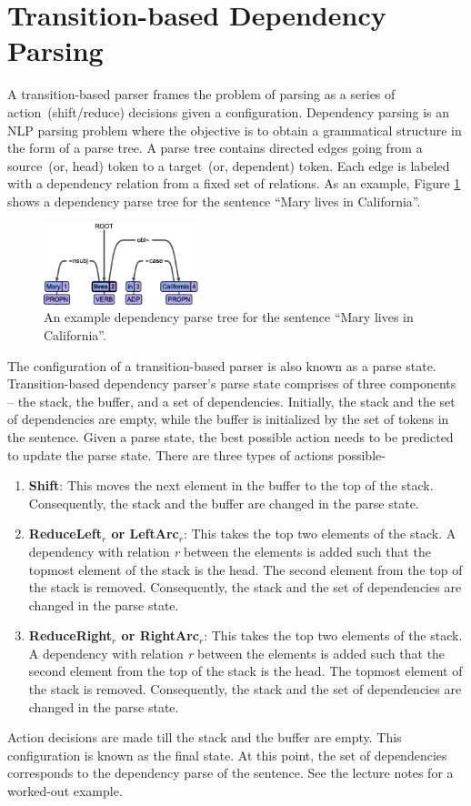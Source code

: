 \section{Transition-based Dependency Parsing}
A transition-based parser frames the problem of parsing as a series of action~(shift/reduce) decisions given a configuration. Dependency parsing is an NLP parsing problem where the objective is to obtain a grammatical structure in the form of a parse tree. A parse tree contains directed edges going from a source~(or, head) token to a target~(or, dependent) token. Each edge is labeled with a dependency relation from a fixed set of relations. As an example, Figure \ref{fig:ex} shows a dependency parse tree for the sentence ``Mary lives in California''.
\begin{figure}[h!]
    \centering
    \includegraphics[width=0.4\textwidth]{ud_example.png}
    \caption{An example dependency parse tree for the sentence ``Mary lives in California''.}
    \label{fig:ex}
\end{figure}

The configuration of a transition-based parser is also known as a parse state.  Transition-based dependency parser's parse state comprises of three components -- the stack, the buffer, and a set of dependencies. Initially, the stack and the set of dependencies are empty, while the buffer is initialized by the set of tokens in the sentence. Given a parse state, the best possible action needs to be predicted to update the parse state. There are three types of actions possible-
\begin{enumerate}
    \item \textbf{Shift}: This moves the next element in the buffer to the top of the stack. Consequently, the stack and the buffer are changed in the parse state.
    \item \textbf{ReduceLeft$_{r}$ or LeftArc$_{r}$}: This takes the top two elements of the stack. A dependency with relation \emph{r} between the elements is added such that the topmost element of the stack is the head. The second element from the top of the stack is removed.  Consequently, the stack and the set of dependencies are changed in the parse state.
    \item \textbf{ReduceRight$_{r}$ or RightArc$_{r}$}: This takes the top two elements of the stack. A dependency with relation \emph{r} between the elements is added such that the second element from the top of the stack is the head. The topmost element of the stack is removed.  Consequently, the stack and the set of dependencies are changed in the parse state.
\end{enumerate}
Action decisions are made till the stack and the buffer are empty. This configuration is known as the final state. At this point, the set of dependencies corresponds to the dependency parse of the sentence. See the lecture notes for a worked-out example.

